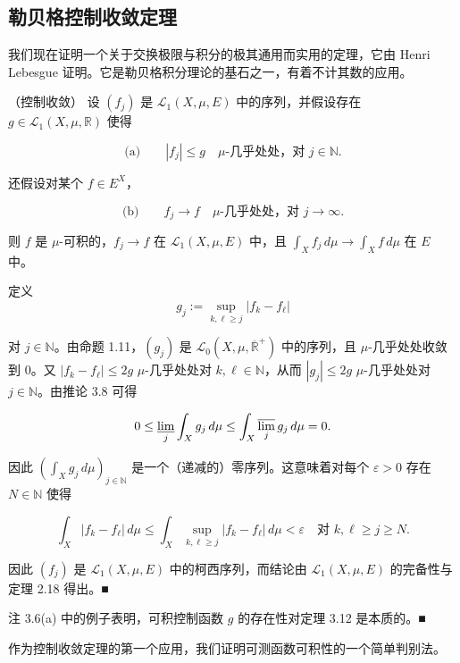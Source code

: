 \subsection*{勒贝格控制收敛定理}

我们现在证明一个关于交换极限与积分的极其通用而实用的定理，它由 Henri Lebesgue 证明。它是勒贝格积分理论的基石之一，有着不计其数的应用。

\begin{theorem}

（控制收敛） 设 $ (f_j) $ 是 $ \mathcal{L}_1(X,\mu,E) $ 中的序列，并假设存在 $ g \in \mathcal{L}_1(X,\mu,\mathbb{R}) $ 使得

\[
\text{(a)} \qquad |f_j| \le g \quad \mu\text{-几乎处处，对 } j \in \mathbb{N}.
\]

还假设对某个 $ f \in E^X $，

\[
\text{(b)} \qquad f_j \to f \quad \mu\text{-几乎处处，对 } j \to \infty.
\]

则 $ f $ 是 $ \mu $-可积的，$ f_j \to f $ 在 $ \mathcal{L}_1(X,\mu,E) $ 中，且 $ \int_X f_j \, d\mu \to \int_X f \, d\mu $ 在 $ E $ 中。

\proofhead
定义
\[
g_j := \sup_{k,\ell \ge j} |f_k - f_\ell|
\]

对 $ j \in \mathbb{N} $。由命题 1.11，$ (g_j) $ 是 $ \mathcal{L}_0(X,\mu,\overline{\mathbb{R}}^+) $ 中的序列，且 $ \mu $-几乎处处收敛到 0。又 $ |f_k - f_\ell| \le 2g $ $ \mu $-几乎处处对 $ k,\ell \in \mathbb{N} $，从而 $ |g_j| \le 2g $ $ \mu $-几乎处处对 $ j \in \mathbb{N} $。由推论 3.8 可得

\[
0 \le \varliminf_{j} \int_X g_j \, d\mu \le \int_X \varlimsup_{j} g_j \, d\mu = 0.
\]

因此 $ \left( \int_X g_j \, d\mu \right)_{j \in \mathbb{N}} $ 是一个（递减的）零序列。这意味着对每个 $ \varepsilon > 0 $ 存在 $ N \in \mathbb{N} $ 使得

\[
\int_X |f_k - f_\ell| \, d\mu \le \int_X \sup_{k,\ell \ge j} |f_k - f_\ell| \, d\mu < \varepsilon \quad \text{对 } k,\ell \ge j \ge N.
\]

因此 $ (f_j) $ 是 $ \mathcal{L}_1(X,\mu,E) $ 中的柯西序列，而结论由 $ \mathcal{L}_1(X,\mu,E) $ 的完备性与定理 2.18 得出。\nobreak\hspace{0.35em}■

\end{theorem}

\begin{remark}

注 3.6(a) 中的例子表明，可积控制函数 $ g $ 的存在性对定理 3.12 是本质的。\nobreak\hspace{0.35em}■

作为控制收敛定理的第一个应用，我们证明可测函数可积性的一个简单判别法。

\end{remark}

